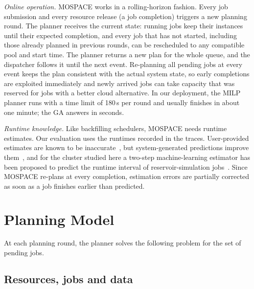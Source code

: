 \documentclass[conference]{IEEEtran}
\begin{document}
\emph{Online operation.} MOSPACE works in a rolling-horizon fashion. Every job submission and every resource release (a job completion) triggers a new planning round. The planner receives the current state: running jobs keep their instances until their expected completion, and every job that has not started, including those already planned in previous rounds, can be rescheduled to any compatible pool and start time. The planner returns a new plan for the whole queue, and the dispatcher follows it until the next event. Re-planning all pending jobs at every event keeps the plan consistent with the actual system state, so early completions are exploited immediately and newly arrived jobs can take capacity that was reserved for jobs with a better cloud alternative. In our deployment, the MILP planner runs with a time limit of 180\,s per round and usually finishes in about one minute; the GA answers in seconds. 

\emph{Runtime knowledge.} Like backfilling schedulers, MOSPACE needs runtime estimates. Our evaluation uses the runtimes recorded in the traces. User-provided estimates are known to be inaccurate~\cite{Mualem2001}, but system-generated predictions improve them~\cite{Tsafrir2007}, and for the cluster studied here a two-step machine-learning estimator has been proposed to predict the runtime interval of reservoir-simulation jobs~\cite{Nunes2025}. Since MOSPACE re-plans at every completion, estimation errors are partially corrected as soon as a job finishes earlier than predicted.

\section{Planning Model}
\label{sec:model}

At each planning round, the planner solves the following problem for the set of pending jobs.

\subsection{Resources, jobs and data}
\end{document}
